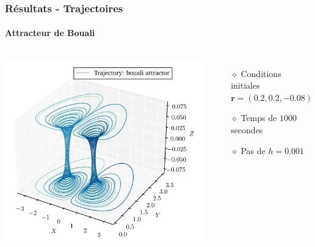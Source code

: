 \begin{frame}
    \frametitle{Résultats - Trajectoires}
    \framesubtitle{Attracteur de Bouali}
    \begin{columns}
        \centering
        \includegraphics[scale=0.6]{figures/trajectories/traj_bouali.png}
        \begin{itemize}
            \setlength\itemsep{1em}
            \item[$\diamond$] Conditions initiales $\bm{r} = (0.2, 0.2, -0.08)$ \\
            \item[$\diamond$] Temps de $1000$ secondes
            \item[$\diamond$] Pas de $h = 0.001$
        \end{itemize}
    \end{columns}
\end{frame}

\begin{frame}
    \begin{center}
    \vspace{0.5cm}
    \end{center}
\end{frame}


